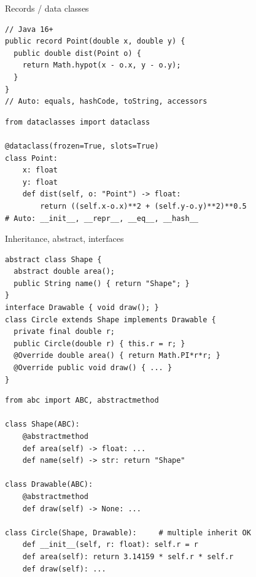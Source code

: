 \documentclass[10pt]{article}
\begin{document}
\begin{construct}{Records / data classes}
\noindent
\begin{minipage}[t]{0.485\linewidth}
\begin{lstlisting}[style=java, title=Java]
// Java 16+
public record Point(double x, double y) {
  public double dist(Point o) {
    return Math.hypot(x - o.x, y - o.y);
  }
}
// Auto: equals, hashCode, toString, accessors
\end{lstlisting}
\end{minipage}\hfill
\begin{minipage}[t]{0.485\linewidth}
\begin{lstlisting}[style=python, title=Python]
from dataclasses import dataclass

@dataclass(frozen=True, slots=True)
class Point:
    x: float
    y: float
    def dist(self, o: "Point") -> float:
        return ((self.x-o.x)**2 + (self.y-o.y)**2)**0.5
# Auto: __init__, __repr__, __eq__, __hash__
\end{lstlisting}
\end{minipage}
\end{construct}

\begin{construct}{Inheritance, abstract, interfaces}
\noindent
\begin{minipage}[t]{0.485\linewidth}
\begin{lstlisting}[style=java, title=Java]
abstract class Shape {
  abstract double area();
  public String name() { return "Shape"; }
}
interface Drawable { void draw(); }
class Circle extends Shape implements Drawable {
  private final double r;
  public Circle(double r) { this.r = r; }
  @Override double area() { return Math.PI*r*r; }
  @Override public void draw() { ... }
}
\end{lstlisting}
\end{minipage}\hfill
\begin{minipage}[t]{0.485\linewidth}
\begin{lstlisting}[style=python, title=Python]
from abc import ABC, abstractmethod

class Shape(ABC):
    @abstractmethod
    def area(self) -> float: ...
    def name(self) -> str: return "Shape"

class Drawable(ABC):
    @abstractmethod
    def draw(self) -> None: ...

class Circle(Shape, Drawable):     # multiple inherit OK
    def __init__(self, r: float): self.r = r
    def area(self): return 3.14159 * self.r * self.r
    def draw(self): ...
\end{lstlisting}
\end{minipage}
\end{construct}
\end{document}
